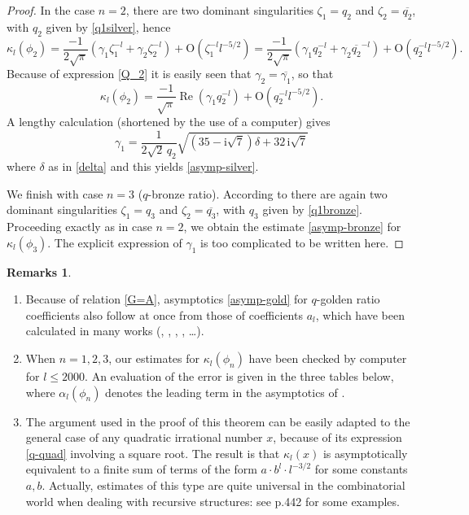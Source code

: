 \documentclass[11pt,reqno]{amsart}
\theoremstyle{plain}
\theoremstyle{definition}
\newtheorem{remarques}[lemme]{Remarks}
\numberwithin{figure}{section}
\numberwithin{table}{section}
\numberwithin{equation}{section}
\newcommand\al{\alpha}
\newcommand\de{\delta}
\newcommand\ga{\gamma}
\newcommand\ka{\kappa}
\newcommand{\ov}[1]{\overline {#1}}
\newcommand\bigo{\mathrm{O}}
\newcommand\ip{\ensuremath{\mathrm{i}}}
\DeclareMathOperator{\re}{Re}
\let\fr=\frac
\begin{document}
\begin{proof}
In the case $n=2$, there are two dominant singularities $\zeta_1=q_2$ and $\zeta_2=\ov{q_2}$, with $q_2$ given by \eqref{q1silver}, hence
\begin{equation*}
\ka_l(\phi_2)
=\fr{-1}{2\sqrt{\pi}}\left(\ga_1\zeta_1^{-l}+\ga_2\zeta_2^{-l}\right)+\bigo(\zeta_1^{-l}l^{-5/2})
=\fr{-1}{2\sqrt{\pi}}\left(\ga_1 q_2^{-l}+\ga_2\ov{q_2}^{-l}\right)+\bigo(q_2^{-l}l^{-5/2}).
\end{equation*}
Because of expression \eqref{Q_2} it is easily seen that $\ga_2=\ov{\ga_1}$, so that
\begin{equation*}
\ka_l(\phi_2)
=\fr{-1}{\sqrt{\pi}}\re(\ga_1 q_2^{-l})+\bigo(q_2^{-l}l^{-5/2}).
\end{equation*}
A lengthy calculation (shortened by the use of a computer) gives 
\begin{equation*}
\ga_1=\fr{1}{2\sqrt{2}\,q_2}\sqrt{(35-\ip\sqrt{7})\de+32\,\ip\sqrt{7}}
\end{equation*}
where $\de$ as in \eqref{delta} and this yields \eqref{asymp-silver}.

We finish with case $n=3$ ($q$-bronze ratio). According to  there are again two dominant singularities $\zeta_1=q_3$ and $\zeta_2=\ov{q_3}$, with $q_3$ given by \eqref{q1bronze}. Proceeding exactly as in case $n=2$, we obtain
the estimate \eqref{asymp-bronze} for $\ka_l(\phi_3)$. The explicit expression of $\ga_1$ is too complicated to be written here.
\end{proof}


\begin{remarques}
\begin{enumerate}[wide]
\item Because of  relation \eqref{G=A},  asymptotics \eqref{asymp-gold} for  $q$-golden ratio coefficients  also follow at once from those of  coefficients $a_l$, which have been calculated in many works (\cite{SW79}, \cite{HSS98}, \cite{DSV04}, \cite{JR08}, \cite{Prodinger23}…). 
\item When $n=1,2,3$, our estimates for $\ka_l(\phi_n)$ have been checked by computer for $l≤2000$. An evaluation of the error is given in the three tables below, where $\al_l(\phi_n)$ denotes the leading term in the asymptotics of .
\item The argument used in the proof of this theorem can be easily adapted to the general case of any quadratic irrational number $x$, because of its expression \eqref{q-quad} involving a square root. The result is that  $\ka_l(x)$ is asymptotically equivalent to a finite sum of terms of the form $a\cdot b^l\cdot l^{-3/2}$ for some constants $a,b$.
Actually, estimates of this type are quite universal in the combinatorial world when dealing with recursive structures: see \cite{FS} p.442 for some examples. 
\end{enumerate}
\end{remarques}
\end{document}
